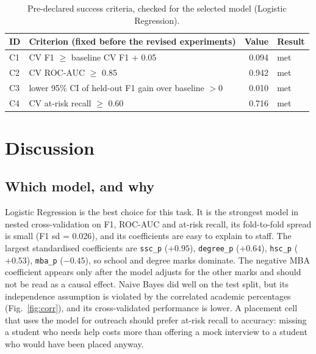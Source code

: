 \documentclass[runningheads]{llncs}
\begin{document}
\begin{table}[htbp]
\centering
\caption{Pre-declared success criteria, checked for the selected model (Logistic Regression).}\label{tab:crit}
\scriptsize
\begin{tabular}{llrl}
\toprule
ID & Criterion (fixed before the revised experiments) & Value & Result \\
\midrule
C1 & CV F1 $\geq$ baseline CV F1 + 0.05 & 0.094 & met \\
C2 & CV ROC-AUC $\geq$ 0.85 & 0.942 & met \\
C3 & lower 95\% CI of held-out F1 gain over baseline $>0$ & 0.010 & met \\
C4 & CV at-risk recall $\geq$ 0.60 & 0.716 & met \\
\bottomrule
\end{tabular}
\end{table}

\section{Discussion}\label{sec:discussion}
\subsection{Which model, and why}
Logistic Regression is the best choice for this task. It is the strongest model in nested cross-validation on F1, ROC-AUC and at-risk recall, its fold-to-fold spread is small (F1 sd = 0.026), and its coefficients are easy to explain to staff. The largest standardised coefficients are \texttt{ssc\_p} ($+0.95$), \texttt{degree\_p} ($+0.64$), \texttt{hsc\_p} ($+0.53$), \texttt{mba\_p} ($-0.45$), so school and degree marks dominate. The negative MBA coefficient appears only after the model adjusts for the other marks and should not be read as a causal effect. Naive Bayes did well on the test split, but its independence assumption is violated by the correlated academic percentages (Fig.~\ref{fig:corr}), and its cross-validated performance is lower. A placement cell that uses the model for outreach should prefer at-risk recall to accuracy: missing a student who needs help costs more than offering a mock interview to a student who would have been placed anyway.
\end{document}
